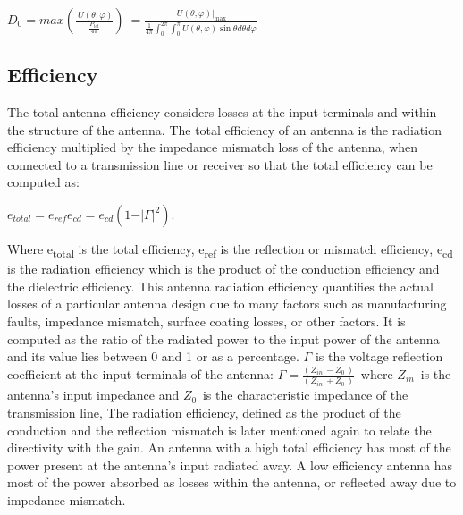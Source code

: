 $ D_{0}=max \left( \frac{~U \left(  \theta , \varphi  \right) }{\frac{P_{tot}}{4 \pi }} \right) ~=\frac{~  U \left(  \theta , \varphi  \right)  \vert_{\max }}{\frac{1}{4 \pi } \int_{0}^{2 \pi } \int _{0}^{ \pi }U \left(  \theta , \varphi  \right) \sin  \theta d \theta d \varphi } $







\subsection{Efficiency}

The total antenna efficiency considers losses at the input terminals and within the structure of the antenna. The total efficiency of an antenna is the radiation efficiency multiplied by the impedance mismatch loss of the antenna, when connected to a transmission line or receiver so that the total efficiency can be computed as:

\begin{center}
$ e_{total}= e_{ref}e_{cd}= e_{cd} \left( 1- \vert  \Gamma  \vert ^{2} \right)  $.
\end{center}

Where e\textsubscript{total} is the total efficiency, e\textsubscript{ref} is the reflection or mismatch efficiency, e\textsubscript{cd }is the radiation efficiency which is the product of the conduction efficiency and the dielectric efficiency. This antenna radiation efficiency quantifies the actual losses of a particular antenna design due to many factors such as manufacturing faults, impedance mismatch, surface coating losses, or other factors. It is computed as the ratio of the radiated power to the input power of the antenna and its value lies between 0 and 1 or as a percentage. $\Gamma$ is the voltage reflection coefficient at the input terminals of the antenna:  $\Gamma =\frac{ \left( Z_{in~}- Z_{0~} \right) }{ \left( Z_{in~}+ Z_{0~} \right) }$\  where  $Z_{in~}$ is the antenna’s input impedance and  $Z_{0~}$ is the characteristic impedance of the transmission line, The radiation efficiency, defined as the product of the conduction and the reflection mismatch is later mentioned again to relate the directivity with the gain. An antenna with a high total efficiency has most of the power present at the antenna's input radiated away. A low efficiency antenna has most of the power absorbed as losses within the antenna, or reflected away due to impedance mismatch.

